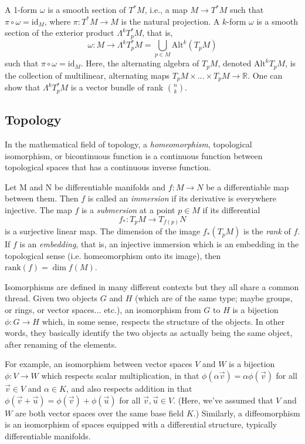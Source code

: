 \documentclass{article}
\theoremstyle{plain}
\theoremstyle{definition}
\numberwithin{equation}{section}
\newcommand{\R}{\ensuremath{\mathbb{R}}}
\newcommand{\Alt}{\ensuremath{\mathrm{Alt}}}
\newcommand{\id}{\ensuremath{\mathrm{id}}}
\begin{document}
A 1-form $\omega$ is a smooth section of $T^*M$, i.e., a map $M\to T^*M$ such that $\pi\circ \omega=\id_M$, where $\pi:T^*M\to M$ is the natural projection. A $k$-form $\omega$ is a smooth section of the exterior product $\Lambda^kT_p^*M$, that is,
\[
 \omega:M\to \Lambda^kT_p^*M = \bigcup_{p\in M}\Alt^k(T_pM)
\]
such that $\pi\circ \omega=\id_M$. Here, the alternating algebra of $T_pM$, denoted $\Alt^kT_pM$, is the collection of multilinear, alternating maps $T_pM\times ...\times T_pM\to \R$. One can show that $\Lambda^kT_p^*M$ is a vector bundle of rank $\binom{n}{k}$.

\subsection{Topology}
In the mathematical field of topology, a \textit{homeomorphism}, topological isomorphism, or bicontinuous function is a continuous function between topological spaces that has a continuous inverse function.

Let M and N be differentiable manifolds and $f: M\to N$ be a differentiable map between them. Then $f$ is called an \textit{immersion} if its derivative is everywhere injective. The map $f$ is a \textit{submersion} at a point $p\in M$ if its differential
\[
f_*:T_pM\to T_{f(p)}N
\]
is a surjective linear map. The dimension of the image $f_*(T_pM)$ is the \textit{rank} of $f$. If $f$ is an \textit{embedding}, that is, an injective immersion which is an embedding in the topological sense (i.e. homeomorphism onto its image), then $\mathrm{rank}(f)=\dim f(M)$.

Isomorphisms are defined in many different contexts but they all share a common thread. Given two objects $G$ and $H$ (which are of the same type; maybe groups, or rings, or vector spaces... etc.), an isomorphism from $G$ to $H$ is a bijection $\phi:G\to H$ which, in some sense, respects the structure of the objects. In other words, they basically identify the two objects as actually being the same object, after renaming of the elements.

For example, an isomorphism between vector spaces $V$ and $W$ is a bijection $\phi:V\to W$ which respects scalar multiplication, in that $\phi(\alpha\vec{v})=\alpha\phi(\vec{v})$ for all $\vec{v}\in V$ and $\alpha\in K$, and also respects addition in that $\phi(\vec{v}+\vec{u})=\phi(\vec{v})+\phi(\vec{u})$ for all $\vec{v},\vec{u}\in V$. (Here, we've assumed that $V$ and $W$ are both vector spaces over the same base field $K$.) Similarly, a diffeomorphism is an isomorphism of spaces equipped with a differential structure, typically differentiable manifolds.
\end{document}
